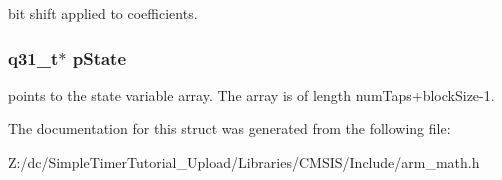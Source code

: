 bit shift applied to coefficients. \hypertarget{structarm__lms__instance__q31_adee4ba3ee8869865af7d8fa08ca913d6}{
\subsubsection[{p\-State}]{\setlength{\rightskip}{0pt plus 5cm}q31\-\_\-t$\ast$ p\-State}}\label{structarm__lms__instance__q31_adee4ba3ee8869865af7d8fa08ca913d6}
points to the state variable array. The array is of length num\-Taps+block\-Size-\/1. 

The documentation for this struct was generated from the following file\-:\begin{DoxyCompactItemize}
\item 
Z\-:/dc/\-Simple\-Timer\-Tutorial\-\_\-\-Upload/\-Libraries/\-C\-M\-S\-I\-S/\-Include/arm\-\_\-math.\-h\end{DoxyCompactItemize}

